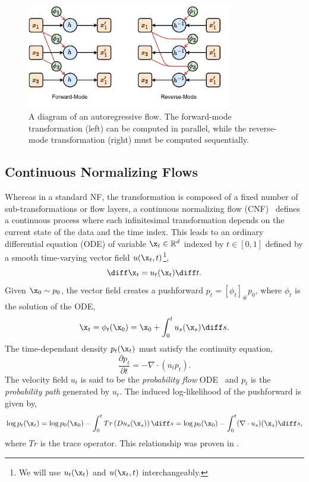 \begin{figure}[ht]
    \centering
    \includegraphics[width=0.8\textwidth]{Figures/generative_models/autoreg.pdf}
    \caption{A diagram of an autoregressive flow. The forward-mode transformation (left) can be computed in parallel, while the reverse-mode transformation (right) must be computed sequentially.}
    \label{fig:autoregressive_flow}
\end{figure}

\subsection{Continuous Normalizing Flows}

Whereas in a standard NF, the transformation is composed of a fixed number of sub-transformations or flow layers, a continuous normalizing flow (CNF)~\cite{NeuralODE} defines a continuous process where each infinitesimal transformation depends on the current state of the data and the time index.
This leads to an ordinary differential equation (ODE) of variable $\x_t \in \mathbb{R}^d$ indexed by $t \in [0, 1]$ defined by a smooth time-varying vector field $u(\x_t, t)$\footnote{We will use $u_t(\x_t)$ and $u(\x_t, t)$ interchangeably.},
\begin{equation}
    \label{eq:cnf}
    \diff \x_t = u_t(\x_t) \diff t.
\end{equation}
Given $\x_0 \sim p_0$, the vector field creates a pushforward $p_t = [\phi_t]_\# p_0$, where $\phi_t$ is the solution of the ODE,
\begin{equation}
    \label{eq:cnf_pushforward}
    \x_t = \phi_t(\x_0) = \x_0 + \int_0^t u_s(\x_s) \diff s.
\end{equation}
The time-dependant density $p_t(\x_t)$ must satisfy the continuity equation,
\begin{equation}
    \label{eq:cnf_continuity}
    \frac{\partial p_t}{\partial t} = -\nabla \cdot (u_t p_t).
\end{equation}
The velocity field $u_t$ is said to be the \textit{probability flow} ODE~\cite{ScoreBasedGenerativeModeling} and $p_t$ is the \textit{probability path} generated by $u_t$.
The induced log-likelihood of the pushforward is given by,
\begin{equation}
    \label{eq:cnf_loglikelihood}
    \log p_t(\x_t)
    = \log p_0(\x_0) - \int_0^t Tr\left(D u_s(\x_s)\right)\diff s
    = \log p_0(\x_0) - \int_0^t (\nabla \cdot u_s)(\x_s) \diff s,
\end{equation}
where $Tr$ is the trace operator.
This relationship was proven in \textcite{NeuralODE}.

